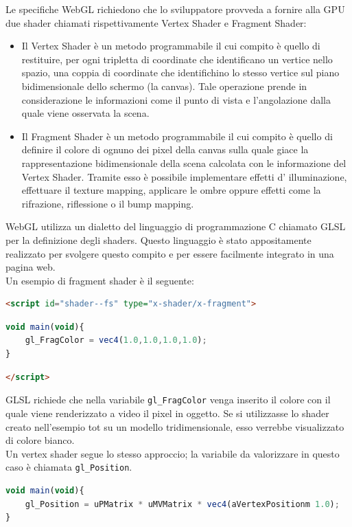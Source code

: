 Le specifiche WebGL richiedono che lo sviluppatore provveda a fornire alla GPU due shader chiamati rispettivamente Vertex Shader e Fragment Shader:
\begin{itemize}
\item Il Vertex Shader è un metodo programmabile il cui compito è quello di restituire, per ogni tripletta di coordinate che identificano un vertice nello spazio, una coppia di coordinate che identifichino lo stesso vertice sul piano bidimensionale dello schermo (la canvas). Tale operazione prende in considerazione le informazioni come il punto di vista e l’angolazione dalla quale viene osservata la scena.
\item Il Fragment Shader è un metodo programmabile il cui compito è quello di definire il colore di ognuno dei pixel della canvas sulla quale giace la rappresentazione bidimensionale della scena calcolata con le informazione del Vertex Shader. Tramite esso è possibile implementare effetti d’ illuminazione, effettuare il texture mapping, applicare le ombre oppure effetti come la rifrazione, riflessione o il bump mapping.
\end{itemize}
WebGL utilizza un dialetto del linguaggio di programmazione C chiamato GLSL per la definizione degli shaders. Questo linguaggio è stato appositamente realizzato per svolgere questo compito e per essere facilmente integrato in una pagina web.
\\
Un esempio di fragment shader è il seguente:


\begin{lstlisting}[language=html]
<script id="shader--fs" type="x-shader/x-fragment">
\end{lstlisting}
\begin{lstlisting}[language=javascript]
void main(void){
	gl_FragColor = vec4(1.0,1.0,1.0,1.0);
}
\end{lstlisting}
\begin{lstlisting}[language=html]
</script>
\end{lstlisting}

GLSL richiede che nella variabile \texttt{gl\_FragColor} venga inserito il colore con il quale viene renderizzato a video il pixel in oggetto. Se si utilizzasse lo shader creato nell’esempio tot su un modello tridimensionale, esso verrebbe visualizzato di colore bianco.
\\
Un vertex shader segue lo stesso approccio; la variabile da valorizzare in questo caso è chiamata \texttt{gl\_Position}.

\begin{lstlisting}[language=javascript]
void main(void){
	gl_Position = uPMatrix * uMVMatrix * vec4(aVertexPositionm 1.0);
}
\end{lstlisting}

